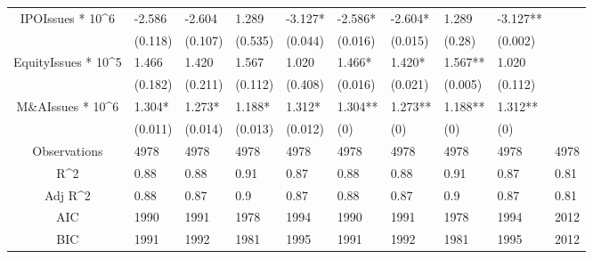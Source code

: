 \documentclass{article}
\begin{document}
\begin{table}[H]
\begin{tabular}{|clllllllll|}
  IPOIssues * 10^6 & -2.586 & -2.604 & 1.289 & -3.127* & -2.586* & -2.604* & 1.289 & -3.127** &  \\ 
   & (0.118) & (0.107) & (0.535) & (0.044) & (0.016) & (0.015) & (0.28) & (0.002) &  \\ 
  EquityIssues * 10^5 & 1.466 & 1.420 & 1.567 & 1.020 & 1.466* & 1.420* & 1.567** & 1.020 &  \\ 
   & (0.182) & (0.211) & (0.112) & (0.408) & (0.016) & (0.021) & (0.005) & (0.112) &  \\ 
  M\&AIssues * 10^6 & 1.304* & 1.273* & 1.188* & 1.312* & 1.304** & 1.273** & 1.188** & 1.312** &  \\ 
   & (0.011) & (0.014) & (0.013) & (0.012) & (0) & (0) & (0) & (0) &  \\ 
  \hline 
 Observations & 4978 & 4978 & 4978 & 4978 & 4978 & 4978 & 4978 & 4978 & 4978 \\ 
  R^2 & 0.88 & 0.88 & 0.91 & 0.87 & 0.88 & 0.88 & 0.91 & 0.87 & 0.81 \\ 
  Adj R^2 & 0.88 & 0.87 & 0.9 & 0.87 & 0.88 & 0.87 & 0.9 & 0.87 & 0.81 \\ 
  AIC & 1990 & 1991 & 1978 & 1994 & 1990 & 1991 & 1978 & 1994 & 2012 \\ 
  BIC & 1991 & 1992 & 1981 & 1995 & 1991 & 1992 & 1981 & 1995 & 2012 \\ 
   \hline
\end{tabular}
 
\end{table}
\end{document}
